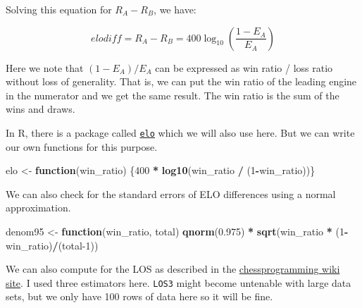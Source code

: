 \documentclass[]{article}
\newenvironment{Shaded}{\begin{snugshade}}{\end{snugshade}}
\newcommand{\ControlFlowTok}[1]{\textcolor[rgb]{0.13,0.29,0.53}{\textbf{#1}}}
\newcommand{\DecValTok}[1]{\textcolor[rgb]{0.00,0.00,0.81}{#1}}
\newcommand{\FloatTok}[1]{\textcolor[rgb]{0.00,0.00,0.81}{#1}}
\newcommand{\KeywordTok}[1]{\textcolor[rgb]{0.13,0.29,0.53}{\textbf{#1}}}
\newcommand{\NormalTok}[1]{#1}
\newcommand{\OperatorTok}[1]{\textcolor[rgb]{0.81,0.36,0.00}{\textbf{#1}}}
\newcommand{\StringTok}[1]{\textcolor[rgb]{0.31,0.60,0.02}{#1}}
\begin{document}
Solving this equation for \(R_A-R_B\), we have:

\begin{equation}
elodiff = R_A-R_B = 400\log_{10}\left( \frac{1-E_A}{E_A}\right)
\end{equation}

Here we note that \((1-E_A)/E_A\) can be expressed as win ratio / loss
ratio without loss of generality. That is, we can put the win ratio of
the leading engine in the numerator and we get the same result. The win
ratio is the sum of the wins and draws.

In R, there is a package called
\href{https://CRAN.R-project.org/package=elo}{\texttt{elo}} which we
will also use here. But we can write our own functions for this purpose.

\begin{Shaded}
\begin{Highlighting}[]
\NormalTok{elo <-}\StringTok{ }\ControlFlowTok{function}\NormalTok{(win_ratio) \{}\DecValTok{400} \OperatorTok{*}\StringTok{ }\KeywordTok{log10}\NormalTok{(win_ratio }\OperatorTok{/}\StringTok{ }\NormalTok{(}\DecValTok{1}\OperatorTok{-}\NormalTok{win_ratio))\}}
\end{Highlighting}
\end{Shaded}

We can also check for the standard errors of ELO differences using a
normal approximation.

\begin{Shaded}
\begin{Highlighting}[]
\NormalTok{denom95 <-}\StringTok{ }\ControlFlowTok{function}\NormalTok{(win_ratio, total) }\KeywordTok{qnorm}\NormalTok{(}\FloatTok{0.975}\NormalTok{) }\OperatorTok{*}\StringTok{ }\KeywordTok{sqrt}\NormalTok{(win_ratio }\OperatorTok{*}\StringTok{ }\NormalTok{(}\DecValTok{1}\OperatorTok{-}\NormalTok{win_ratio)}\OperatorTok{/}\NormalTok{(total}\DecValTok{-1}\NormalTok{))}
\end{Highlighting}
\end{Shaded}

We can also compute for the LOS as described in the
\href{https://www.chessprogramming.org/Match_Statistics}{chessprogramming
wiki site}. I used three estimators here. \texttt{LOS3} might become
untenable with large data sets, but we only have 100 rows of data here
so it will be fine.
\end{document}
